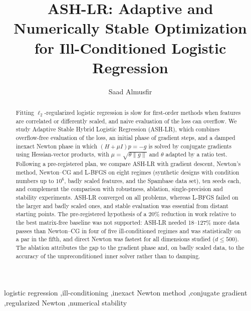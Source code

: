\documentclass[preprint,11pt]{elsarticle}
\begin{document}
\begin{frontmatter}

\title{ASH-LR: Adaptive and Numerically Stable Optimization for Ill-Conditioned Logistic Regression}

\author{Saad Almusfir}

\begin{abstract}
Fitting $\ell_2$-regularized logistic regression is slow for first-order methods when
features are correlated or differently scaled, and naive evaluation of the loss can
overflow. We study Adaptive Stable Hybrid Logistic Regression (ASH-LR), which combines
overflow-free evaluation of the loss, an initial phase of gradient steps, and a damped
inexact Newton phase in which $(H+\mu I)p=-g$ is solved by conjugate gradients using
Hessian-vector products, with $\mu=\sqrt{\theta\lVert g\rVert}$ and $\theta$ adapted by
a ratio test. Following a pre-registered plan, we compare ASH-LR with gradient descent,
Newton's method, Newton--CG and L-BFGS on eight regimes (synthetic designs with
condition numbers up to $10^{6}$, badly scaled features, and the Spambase data set),
ten seeds each, and complement the comparison with robustness, ablation,
single-precision and stability experiments. ASH-LR converged on all problems, whereas
L-BFGS failed on the larger and badly scaled ones, and stable evaluation was essential
from distant starting points. The pre-registered hypothesis of a 20\% reduction in
work relative to the best matrix-free baseline was not supported: ASH-LR needed
18--127\% more data passes than Newton--CG in four of five ill-conditioned regimes and
was statistically on a par in the fifth, and direct Newton was fastest for all dimensions studied
($d\le500$). The ablation attributes the gap to the gradient phase and, on badly scaled
data, to the accuracy of the unpreconditioned inner solver rather than to damping.
\end{abstract}

\begin{keyword}
logistic regression \sep ill-conditioning \sep inexact Newton method \sep conjugate gradient \sep regularized Newton \sep numerical stability
\end{keyword}

\end{frontmatter}










\end{document}
